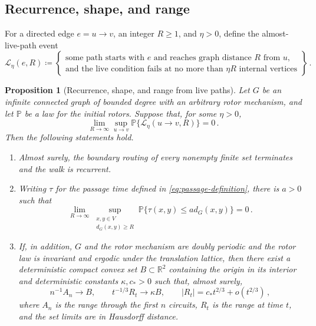 \documentclass[11pt]{amsart}
\theoremstyle{plain}
\newtheorem{proposition}[theorem]{Proposition}
\theoremstyle{definition}
\newcommand{\R}{\mathbb R}
\renewcommand{\P}{\mathbb P}
\begin{document}
	\subsection{Recurrence, shape, and range}
	
	For a directed edge $e=u\to v$, an integer $R\geq1$, and $\eta>0$, define the
	almost-live-path event
	\begin{equation}\label{eq:almost-live-path-event}
		\mathcal L_\eta(e,R)
		\coloneqq
		\left\{
		\begin{array}{c}
			\text{some path starts with $e$ and reaches graph distance $R$ from $u$,}\\
			\text{and the live condition fails at no more than $\eta R$ internal vertices}
		\end{array}
		\right\}\, .
	\end{equation}
	
	\begin{proposition}[Recurrence, shape, and range from live paths]\label{prop:path-reduction}
		Let $G$ be an infinite connected graph of bounded degree with an arbitrary
		rotor mechanism, and let $\P$ be a law for the initial rotors.
		Suppose that, for some $\eta>0$,
		\begin{equation}\label{eq:criterion-path-hypothesis}
			\lim_{R\to\infty}\sup_{u\to v}
			\P\{\mathcal L_\eta(u\to v,R)\}=0\, .
		\end{equation}
		Then the following statements hold.
		\begin{enumerate}[label=\textup{(\roman*)}]
			\item Almost surely, the boundary routing of every nonempty finite set
			terminates and the walk is recurrent.
			\item Writing $\tau$ for the passage time defined in
			\eqref{eq:passage-definition}, there is $a>0$ such that
			\begin{equation}\label{eq:criterion-passage}
				\lim_{R\to\infty}
				\sup_{\substack{x,y\in V\\ d_G(x,y)\geq R}}
				\P\{\tau(x,y)\leq ad_G(x,y)\}=0\, .
			\end{equation}
			\item If, in addition, $G$ and the rotor mechanism are doubly periodic and the
			rotor law is invariant and ergodic under the translation lattice, then there
			exist a deterministic compact convex set $B\subset\R^2$ containing the origin in its interior
			and deterministic constants $\kappa,c_*>0$ such that, almost surely,
			\[
			n^{-1}A_n\longrightarrow B,
			\qquad
			t^{-1/3}R_t\longrightarrow\kappa B,
			\qquad
			|R_t|=c_* t^{2/3}+o(t^{2/3})\, ,
			\]
			where $A_n$ is the range through the first $n$ circuits, $R_t$ is the range at
			time $t$, and the set limits are in Hausdorff distance.
		\end{enumerate}
	\end{proposition}
	
\end{document}
